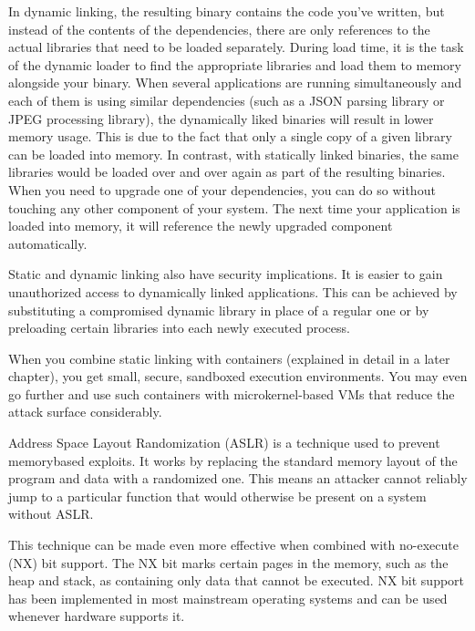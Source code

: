In dynamic linking, the resulting binary contains the code you've written, but instead of the contents of the dependencies, there are only references to the actual libraries that need to be loaded separately. During load time, it is the task of the dynamic loader to find the appropriate libraries and load them to memory alongside your binary. When several applications are running simultaneously and each of them is using similar dependencies (such as a JSON parsing library or JPEG processing library), the dynamically liked binaries will result in lower memory usage. This is due to the fact that only a single copy of a given library can be loaded into memory. In contrast, with statically linked binaries, the same libraries would be loaded over and over again as part of the resulting binaries. When you need to upgrade one of your dependencies, you can do so without touching any other component of your system. The next time your application is loaded into memory, it will reference the newly upgraded component automatically.

Static and dynamic linking also have security implications. It is easier to gain unauthorized access to dynamically linked applications. This can be achieved by substituting a compromised dynamic library in place of a regular one or by preloading certain libraries into each newly executed process.

When you combine static linking with containers (explained in detail in a later chapter), you get small, secure, sandboxed execution environments. You may even go further and use such containers with microkernel-based VMs that reduce the attack surface considerably.


Address Space Layout Randomization (ASLR) is a technique used to prevent memorybased exploits. It works by replacing the standard memory layout of the program and data with a randomized one. This means an attacker cannot reliably jump to a particular function that would otherwise be present on a system without ASLR.

This technique can be made even more effective when combined with no-execute (NX) bit support. The NX bit marks certain pages in the memory, such as the heap and stack, as containing only data that cannot be executed. NX bit support has been implemented in most mainstream operating systems and can be used whenever hardware supports it.



